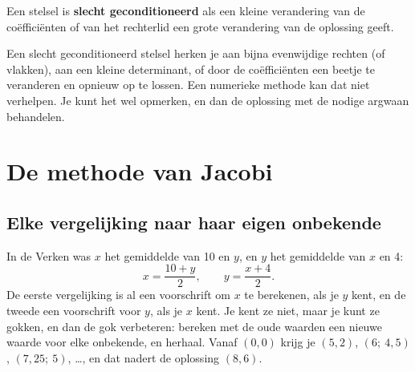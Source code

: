 \begin{theorie}
Een stelsel is \textbf{\textcolor{accent}{slecht geconditioneerd}} als een kleine verandering van de coëfficiënten of van het rechterlid een grote verandering van de oplossing geeft.
\end{theorie}

Een slecht geconditioneerd stelsel herken je aan bijna evenwijdige rechten (of vlakken), aan een kleine determinant, of door de coëfficiënten een beetje te veranderen en opnieuw op te lossen. Een numerieke methode kan dat niet verhelpen. Je kunt het wel opmerken, en dan de oplossing met de nodige argwaan behandelen.


\begin{oefeningen}
\end{oefeningen}

\section{De methode van Jacobi}

\subsection{Elke vergelijking naar haar eigen onbekende}

In de Verken was $x$ het gemiddelde van 10 en $y$, en $y$ het gemiddelde van $x$ en 4:
\[
x = \frac{10 + y}{2}, \qquad y = \frac{x + 4}{2} .
\]
De eerste vergelijking is al een voorschrift om $x$ te berekenen, als je $y$ kent, en de tweede een voorschrift voor $y$, als je $x$ kent. Je kent ze niet, maar je kunt ze gokken, en dan de gok verbeteren: bereken met de oude waarden een nieuwe waarde voor elke onbekende, en herhaal. Vanaf $(0, 0)$ krijg je $(5, 2)$, $(6;\ 4{,}5)$, $(7{,}25;\ 5)$, \ldots, en dat nadert de oplossing $(8, 6)$.

